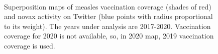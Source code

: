 \documentclass[prb,twocolumn,9pt]{revtex4-1}
\begin{document}
\begin{figure}[t]
\begin{minipage}[]{0.49\linewidth}
	\end{minipage} \\
	\vfill
	\begin{minipage}[c]{0.49\linewidth}
	\centering
	\end{minipage}
	\begin{minipage}[]{0.49\linewidth}
	\centering
	\end{minipage}
	\caption{\label{fig:map_result} Superposition maps of measles vaccination coverage (shades of red) and novax activity on Twitter (blue points with radius proportional to its weight). The years under analysis are 2017-2020. Vaccination coverage for 2020 is not available, so, in 2020 map, 2019 vaccination coverage is used.}
	\end{figure}
    
\end{document}
